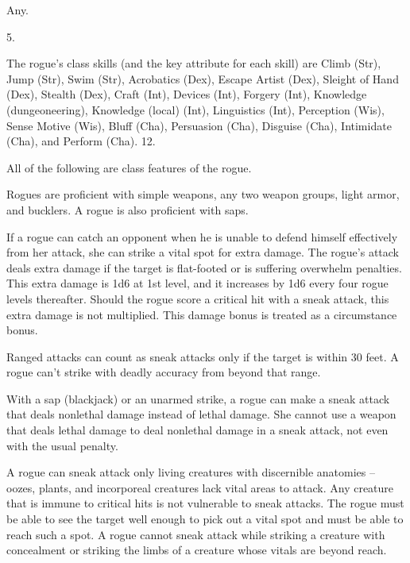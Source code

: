  Any.

 5.

The rogue's class skills (and the key attribute for each skill) are
Climb (Str), Jump (Str), Swim (Str), Acrobatics (Dex), Escape Artist (Dex),  Sleight of Hand (Dex), Stealth (Dex), Craft (Int), Devices (Int), Forgery (Int), Knowledge (dungeoneering), Knowledge (local) (Int), Linguistics (Int), Perception (Wis), Sense Motive (Wis), Bluff (Cha), Persuasion (Cha), Disguise (Cha), Intimidate (Cha), and Perform (Cha).
 12.

All of the following are class features of the rogue.

 Rogues are proficient with simple weapons,  any two weapon groups,  light armor,  and bucklers. A rogue is also proficient with saps.

  If a rogue can catch an opponent when he is unable to defend himself effectively from her attack, she can strike a vital spot for extra damage. The rogue's attack deals extra damage if the target is flat-footed or is suffering overwhelm penalties.  This extra damage is 1d6 at 1st level, and it increases by 1d6 every four rogue levels thereafter. Should the rogue score a critical hit with a sneak attack, this extra damage is not multiplied. This damage bonus is treated as a circumstance bonus.

\par Ranged attacks can count as sneak attacks only if the target is within 30 feet. A rogue can't strike with deadly accuracy from beyond that range.

With a sap (blackjack) or an unarmed strike, a rogue can make a sneak attack that deals nonlethal damage instead of lethal damage. She cannot use a weapon that deals lethal damage to deal nonlethal damage in a sneak attack, not even with the usual  penalty.

A rogue can sneak attack only living creatures with discernible anatomies -- oozes, plants, and incorporeal creatures lack vital areas to attack. Any creature that is immune to critical hits is not vulnerable to sneak attacks. The rogue must be able to see the target well enough to pick out a vital spot and must be able to reach such a spot. A rogue cannot sneak attack while striking a creature with concealment or striking the limbs of a creature whose vitals are beyond reach.


